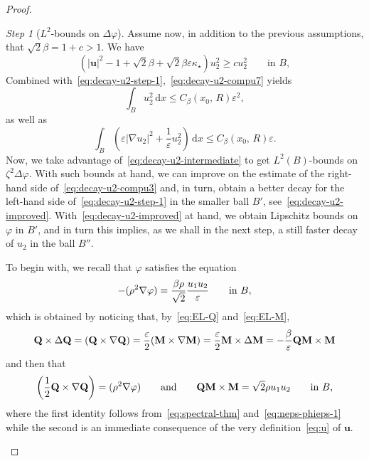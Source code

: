 \documentclass[a4paper, 11pt, twoside, leqno]{article}
\theoremstyle{definition}              %
\theoremstyle{remark}                  %
\newtheorem{step}{Step}
\DeclareMathOperator{\spt}{spt}                                     %
\let\div\relax
\DeclareMathOperator{\div}{div}                                     %
\newcommand{\abs}[1]{\left| #1 \right|}                             %
\newcommand{\csubset}{\subset\!\subset}                             %
\renewcommand{\d}{\mathrm{d}}
\newcommand{\Q}{\mathbf{Q}}
\newcommand{\M}{\mathbf{M}}
\renewcommand{\u}{\mathbf{u}}
\newcommand{\eps}{\varepsilon}
\begin{document}
\begin{proof}
\begin{step}[$L^2$-bounds on $\Delta \varphi$]\label{step:bounds-Delta-phi}
    Assume now, in addition to the previous assumptions, that %
    $\sqrt{2}\beta = 1 + c > 1$. We have 
    \begin{equation}\label{eq:decay-u2-compu7}
        \left( \abs{\u}^2 - 1 + \sqrt{2}\beta + \sqrt{2}\beta \eps \kappa_\star \right) u_2^2 
        \geq c u_2^2 \qquad \mbox{in } B, 
    \end{equation}
    Combined with~\eqref{eq:decay-u2-step-1},~\eqref{eq:decay-u2-compu7} yields
    \begin{equation}\label{eq:decay-u2-intermediate}
        \int_B u_2^2 \,{\d}x \leq C_\beta\left(x_0,\,R \right) \eps^2,
    \end{equation}
    as well as
    \[
        \int_B \left( \eps \abs{\nabla u_2}^2 + \frac{1}{\eps} u_2^2 \right)\,{\d}x \leq C_\beta\left(x_0,\,R \right) \eps.
    \]
    Now, we take advantage of~\eqref{eq:decay-u2-intermediate} to get $L^2(B)$-bounds on $\zeta^2\Delta \varphi$. With such bounds at hand, we can improve on the estimate of the right-hand side of~\eqref{eq:decay-u2-compu3} and, in turn, obtain a better decay for the left-hand side of~\eqref{eq:decay-u2-step-1} in the smaller ball $B'$, see~\eqref{eq:decay-u2-improved}. With~\eqref{eq:decay-u2-improved} at hand, we obtain Lipschitz bounds on $\varphi$ in $B'$, 
    and in turn this implies, as we shall in the next step, a still faster decay of $u_2$ in the ball $B''$.

    To begin with, we recall that $\varphi$ satisfies the equation 
        \begin{equation}\label{eq:varphi}
        -\div(\rho^2 \nabla \varphi) = \frac{\beta \rho }{\sqrt{2}}\frac{u_1 u_2}{\eps} 
        \qquad \mbox{in } B,
    \end{equation}
    which is obtained by noticing that, by~\eqref{eq:EL-Q} and~\eqref{eq:EL-M},  
    \[
        \Q \times \Delta \Q = \div(\Q \times \nabla \Q) 
        = \frac{\eps}{2}\div (\M \times \nabla \M) = 
        \frac{\eps}{2} \M \times \Delta \M 
        = - \frac{\beta}{\eps} \Q\M \times \M
    \]
    and then that
    \[
        \div\left(\frac{1}{2} \Q \times \nabla \Q\right) = 
        \div(\rho^2 \nabla \varphi) 
        \qquad \mbox{and} \qquad 
        \Q\M \times \M
        = \sqrt{2} \rho u_1 u_2 \qquad \mbox{in } B,
    \]
    where the first identity follows from~\eqref{eq:spectral-thm} and~\eqref{eq:neps-phieps-1} while the second is an immediate consequence of the very definition~\eqref{eq:u} of $\u$.
    

\end{step}
\end{proof}
\end{document}
